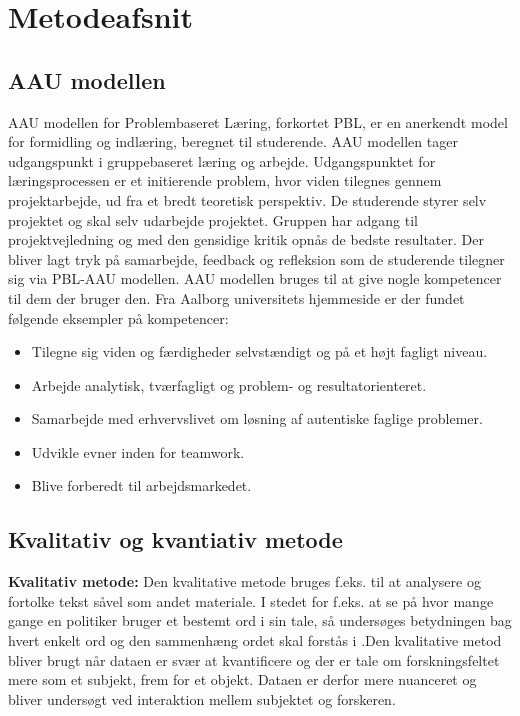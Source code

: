 \chapter{Metodeafsnit}
\section{AAU modellen}
AAU modellen for Problembaseret Læring, forkortet PBL, er en anerkendt model for formidling og indlæring, beregnet til studerende. AAU modellen tager udgangspunkt i gruppebaseret læring og arbejde. Udgangspunktet for læringsprocessen er et initierende problem, hvor viden tilegnes gennem projektarbejde, ud fra et bredt teoretisk perspektiv. De studerende styrer selv projektet og skal selv udarbejde projektet. Gruppen har adgang til projektvejledning og med den gensidige kritik opnås de bedste resultater. Der bliver lagt tryk på samarbejde, feedback og refleksion som de studerende tilegner sig via PBL-AAU modellen.
AAU modellen bruges til at give nogle kompetencer til dem der bruger den. Fra Aalborg universitets hjemmeside er der fundet følgende eksempler på kompetencer:
\begin{itemize}
\item {Tilegne sig viden og færdigheder selvstændigt og på et højt fagligt niveau.}
\item {Arbejde analytisk, tværfagligt og problem- og resultatorienteret.}
\item {Samarbejde med erhvervslivet om løsning af autentiske faglige problemer.}
\item {Udvikle evner inden for teamwork.}
\item {Blive forberedt til arbejdsmarkedet.}
\end{itemize}
\citep{Universitet2015}\citep{Universitet2011}

\section{Kvalitativ og kvantiativ metode}
\textbf{Kvalitativ metode:}
Den kvalitative metode bruges f.eks. til at analysere og fortolke tekst såvel som andet materiale. I stedet for f.eks. at se på hvor mange gange en politiker bruger et bestemt ord i sin tale, så undersøges betydningen bag hvert enkelt ord og den sammenhæng ordet skal forstås i \citep{Gymportalen}.Den kvalitative metod bliver brugt når dataen er svær at kvantificere og der er tale om forskningsfeltet mere som et subjekt, frem for et objekt. Dataen er derfor mere nuanceret og bliver undersøgt ved interaktion mellem subjektet og forskeren\citep{Kval}.\\ 

